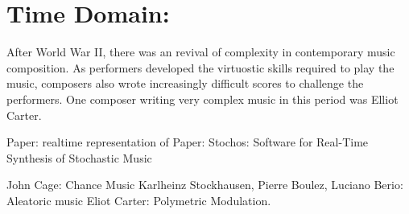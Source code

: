 \chapter{Time Domain: \polytempic}
\label{ch:polytempic}
After World War II, 
there was an revival of complexity in contemporary
music composition.  As performers developed the virtuostic skills
required to play the music, composers also wrote increasingly
difficult scores to challenge the performers.\cite{grout2006} One
composer writing very complex music in this period was Elliot Carter.


Paper: realtime representation of 
Paper: Stochos: Software for Real-Time Synthesis of Stochastic Music




John Cage: Chance Music
Karlheinz Stockhausen, Pierre Boulez, Luciano Berio: Aleatoric music
Eliot Carter: Polymetric Modulation. 


